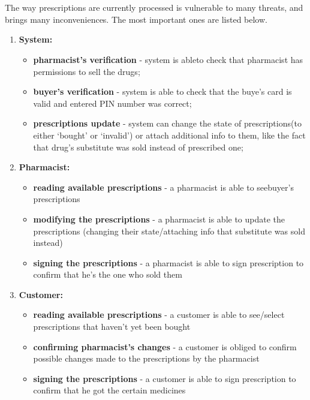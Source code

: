 \chapter{   }
\section{ }


The way prescriptions are currently processed is vulnerable to many threats, and brings many inconveniences. The most important ones are listed below.


\begin{enumerate}
\item{\textbf{System:}}
\begin{itemize}
\item{\textbf{pharmacist's verification} - system is ableto check that pharmacist has permissions to sell the drugs;}
\item{\textbf{buyer's verification} - system is able to check that the buye's card is valid and entered PIN number was correct;}
\item{\textbf{prescriptions update} - system can change the state of prescriptions(to either \textquoteleft{}bought\textquoteright{} or \textquoteleft{}invalid\textquoteright{}) or attach additional info to them, like the fact that drug\textquoteright{}s substitute was sold instead of prescribed one;}
\end{itemize}


\item{\textbf{Pharmacist:}}
\begin{itemize}
\item {\textbf{reading available prescriptions} - a pharmacist is able to seebuyer\textquoteright{}s prescriptions}
\item{\textbf{modifying the prescriptions} - a pharmacist is able to update the prescriptions (changing their state/attaching info that substitute was sold instead)}
\item{\textbf{signing the prescriptions} - a pharmacist is able to sign prescription to confirm that he\textquoteright{}s the one who sold them}
\end{itemize}
\item{\textbf{Customer:}}
\begin{itemize}
\item {\textbf{reading available prescriptions} - a customer is able to see/select prescriptions that haven\textquoteright{}t yet been bought}
\item{\textbf{confirming pharmacist\textquoteright{}s changes} - a customer is obliged to confirm possible changes made to the prescriptions by the pharmacist}
\item{\textbf{signing the prescriptions} - a customer is able to sign prescription
to confirm that he got the certain medicines}
\end{itemize}
\end{enumerate}


